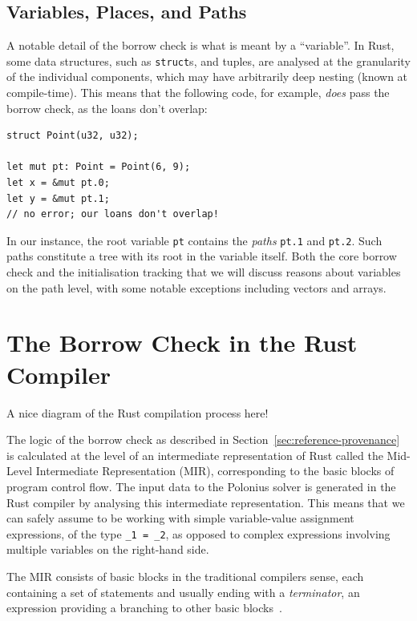 \documentclass[11pt,a4paper,twoside,openany]{report}
\newcommand{\fixme}[1] {{\color{red}#1}}
\newcommand{\InRust}[1]{\texttt{#1}}
\begin{document}
\subsection{Variables, Places, and Paths}
\label{sec:vars-places-paths}

A notable detail of the borrow check is what is meant by a ``variable''. In
Rust, some data structures, such as \InRust{struct}s, and tuples, are analysed
at the granularity of the individual components, which may have arbitrarily deep
nesting (known at compile-time). This means that the following code, for
example, \emph{does} pass the borrow check, as the loans don't overlap:
\begin{verbatim}
struct Point(u32, u32);

let mut pt: Point = Point(6, 9);
let x = &mut pt.0;
let y = &mut pt.1;
// no error; our loans don't overlap!
\end{verbatim}

In our instance, the root variable \InRust{pt} contains the \emph{paths}
\InRust{pt.1} and \InRust{pt.2}. Such paths constitute a tree with its root in
the variable itself. Both the core borrow check and the initialisation tracking
that we will discuss reasons about variables on the path level, with some
notable exceptions including vectors and arrays.

\section{The Borrow Check in the Rust Compiler}
\label{sec:rust-specificts}

\fixme{A nice diagram of the Rust compilation process here!}

The logic of the borrow check as described in
Section~\ref{sec:reference-provenance} is calculated at the level of an
intermediate representation of Rust called the Mid-Level Intermediate
Representation (MIR), corresponding to the basic blocks of program control flow.
The input data to the Polonius solver is generated in the Rust compiler by
analysing this intermediate representation. This means that we can safely assume
to be working with simple variable-value assignment expressions, of the type
\InRust{_1 = _2}, as opposed to complex expressions involving multiple variables
on the right-hand side.

The MIR consists of basic blocks in the traditional compilers sense, each
containing a set of statements and usually ending with a \emph{terminator}, an
expression providing a branching to other basic
blocks~\cite{mir_rfc,rustc_developers_guide_nodate}.
\end{document}
